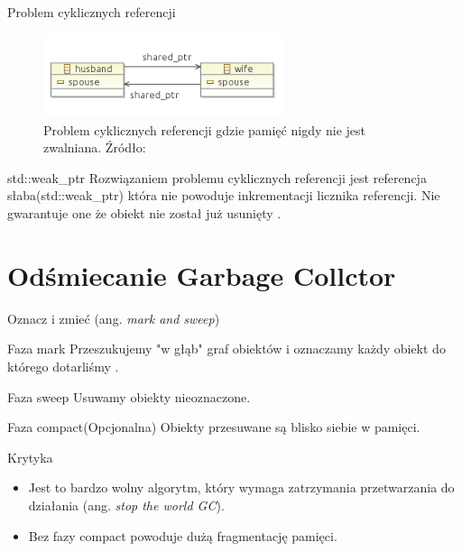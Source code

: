 \documentclass[xcolor=table]{beamer}
\begin{document}
\begin{frame}{Problem cyklicznych referencji}
    \begin{figure}
        \centering
        \includegraphics[width=7cm]{cyclic_ref.png}
        \caption{Problem cyklicznych referencji gdzie pamięć nigdy nie jest zwalniana. Źródło: \cite{weak-ptr-vs-magazine}}
        \label{fig:enter-label}
    \end{figure}

\begin{block}{std::weak\_ptr}
    Rozwiązaniem problemu cyklicznych referencji jest referencja słaba(std::weak\_ptr) która nie powoduje inkrementacji licznika referencji. Nie gwarantuje one że obiekt nie został już usunięty \cite{weak-ptr-vs-magazine, cpp-weak-ptr}. 
\end{block}
\end{frame}



\section{Odśmiecanie  Garbage Collctor}

\begin{frame}{Oznacz i zmieć (ang. \textit{mark and sweep})}
    \begin{block}{Faza mark}
        Przeszukujemy "w głąb" graf obiektów i oznaczamy każdy obiekt do którego dotarliśmy \cite{mark-and-sweep}. 
    \end{block}
    \begin{block}{Faza sweep}
        Usuwamy obiekty nieoznaczone.
    \end{block}
        \begin{block}{Faza compact(Opcjonalna)}
        Obiekty przesuwane są blisko siebie w pamięci.
    \end{block}

    \begin{block}{Krytyka}
    \begin{itemize}
        \item Jest to bardzo wolny algorytm, który wymaga zatrzymania przetwarzania do działania (ang. \textit{stop the world GC}).
        \item  Bez fazy compact powoduje dużą fragmentację pamięci. 
    \end{itemize}
    \end{block}
\end{frame}
\end{document}
